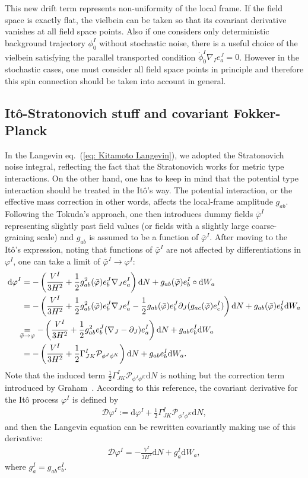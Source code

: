 \documentclass[aps, prd
, preprint
, nofootinbib 
, notitlepage
, longbibliography
]{revtex4-1}
\newcommand{\dd}{\mathrm{d}}
\newcommand{\calD}{\mathcal{D}}
\newcommand{\calP}{\mathcal{P}}
\newcommand{\bae}[1]{\begin{align} #1 \end{align}}
\begin{document}
This new drift term represents non-uniformity of the local frame. If the field space is exactly flat,
the vielbein can be taken so that its covariant derivative vanishes at all field space points.
Also if one considers only deterministic background trajectory $\phi^I_0$ without stochastic noise,
there is a useful choice of the vielbein satisfying the parallel transported condition $\dot{\phi}_0^I\nabla_Ie^J_a=0$. 
However in the stochastic cases, one must consider all field space points in principle and therefore this spin connection should be taken into account in general.


\subsection{It\^o-Stratonovich stuff and covariant Fokker-Planck}

In the Langevin eq.~(\ref{eq: Kitamoto Langevin}), we adopted the Stratonovich noise integral, reflecting the fact that the Stratonovich works for metric type interactions.
On the other hand, one has to keep in mind that the potential type interaction should be treated in the It\^o's way.
The potential interaction, or the effective mass correction in other words, affects the local-frame amplitude $g_{ab}$.
Following the Tokuda's approach, one then introduces dummy fields $\bar{\varphi}^I$ representing slightly past field values (or fields with a slightly large coarse-graining scale) and $g_{ab}$ is assumed to be a function of $\bar{\varphi}^I$.
After moving to the It\^o's expression, noting that functions of $\bar{\varphi}^I$ are not affected by differentiations in $\varphi^I$, one can take a limit of $\bar{\varphi}^I\to\varphi^I$:
\bae{\label{eq: Ito in field space}
    \dd\varphi^I&=-\left(\frac{V^I}{3H^2}+\frac{1}{2}g^2_{ab}(\bar{\varphi})e^J_b\nabla_Je^I_a\right)\dd N
    +g_{ab}(\bar{\varphi})e^I_b\circ\dd W_a \nonumber \\
    &=-\left(\frac{V^I}{3H^2}+\frac{1}{2}g^2_{ab}(\bar{\varphi})e^J_b\nabla_Je^I_a-\frac{1}{2}g_{ab}(\bar{\varphi})e^J_b\partial_J(g_{ac}(\bar{\varphi})e^I_c)\right)\dd N+g_{ab}(\bar{\varphi})e^I_b\dd W_a \nonumber \\
    &\hspace{-5pt}\underset{\bar{\varphi}\to\varphi}{=}-\left(\frac{V^I}{3H^2}+\frac{1}{2}g^2_{ab}e^J_b(\nabla_J-\partial_J)e^I_a\right)\dd N+g_{ab}e^I_b\dd W_a \nonumber \\
    &=-\left(\frac{V^I}{3H^2}+\frac{1}{2}\Gamma^I_{JK}\calP_{\phi^J\phi^K}\right)\dd N+g_{ab}e^I_b\dd W_a.
}
Note that the induced term $\frac{1}{2}\Gamma^I_{JK}\calP_{\phi^J\phi^K}\dd N$ is nothing but the correction term introduced by Graham~\cite{graham1985covariant}.
According to this reference, the covariant derivative for the It\^o process $\varphi^I$ is defined by
\bae{
	\calD\varphi^I:=\dd\varphi^I+\frac{1}{2}\Gamma^I_{JK}\calP_{\phi^J\phi^K}\dd N,
}
and then the Langevin equation can be rewritten covariantly making use of this derivative:
\bae{
	\calD\varphi^I=-\frac{V^I}{3H^2}\dd N+g^I_a\dd W_a,
}
where $g^I_a=g_{ab}e^I_b$.
\end{document}
